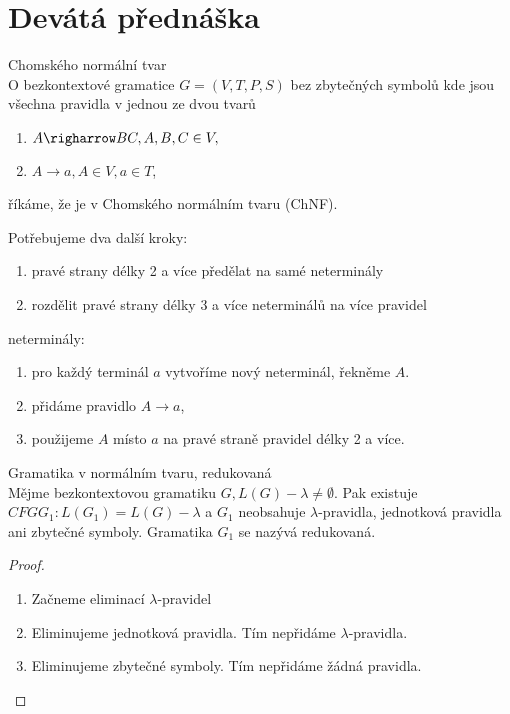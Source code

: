 \documentclass[../main.tex]{subfiles}
\begin{document}
\section{Devátá přednáška}

\begin{definition}
    Chomského normální tvar\\

    O bezkontextové gramatice $G=(V,T,P,S)$ bez zbytečných symbolů kde jsou všechna pravidla v jednou ze dvou tvarů
    \begin{enumerate}
        \item $A \righarrow BC, A,B,C\in V,$
        \item $A \rightarrow a, A \in V, a \in T$,
    \end{enumerate}
    říkáme, že je v Chomského normálním tvaru (ChNF).

    Potřebujeme dva další kroky:
    \begin{enumerate}
        \item pravé strany délky 2 a více předělat na samé neterminály
        \item rozdělit pravé strany délky 3 a více neterminálů na více pravidel
    \end{enumerate}

    \begin{remark}
        neterminály: 
        \begin{enumerate}
            \item pro každý terminál $a$ vytvoříme nový neterminál, řekněme $A$.
            \item přidáme pravidlo $A \rightarrow a$,
            \item použijeme $A$ místo $a$ na pravé straně pravidel délky 2 a více.
        \end{enumerate}
    \end{remark}
    \begin{remark}
        
    \end{remark}
\end{definition}

\begin{theorem}
    Gramatika v normálním tvaru, redukovaná\\

    Mějme bezkontextovou gramatiku $G, L(G) - {\lambda} \neq \emptyset$. Pak existuje $CFG G_1 : L(G_1) = L(G) - {\lambda}$ a 
    $G_1$ neobsahuje $\lambda$-pravidla, jednotková pravidla ani zbytečné symboly. Gramatika $G_1$ se nazývá redukovaná.
    \begin{proof}
        \begin{enumerate}
            \item Začneme eliminací $\lambda$-pravidel
            \item Eliminujeme jednotková pravidla. Tím nepřidáme $\lambda$-pravidla.
            \item Eliminujeme zbytečné symboly. Tím nepřidáme žádná pravidla.
        \end{enumerate}
    \end{proof} 
\end{theorem}
\end{document}
